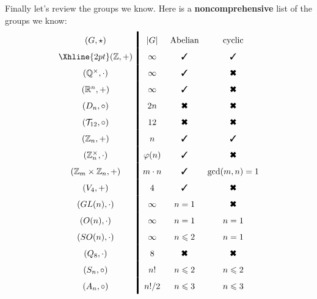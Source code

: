 \documentclass{ximera}
\begin{document}
Finally let's review the groups we know. Here is a
\textbf{noncomprehensive} list of the groups we know:
\[
\renewcommand{\arraystretch}{1.6}
\begin{array}{c!{\vline width 2pt}cccccc}
  (G,\star)                & |G|           & \text{Abelian}        & \text{cyclic}        \\  \Xhline{2pt}
  (\Z,+)                   & \infty        & \text{\ding{51}}      & \text{\ding{51}}     \\
  (\Q^\times,\cdot)        & \infty        & \text{\ding{51}}      & \text{\ding{54}}     \\
  (\R^n,+)                 & \infty        & \text{\ding{51}}      & \text{\ding{54}}     \\
  (D_n,\circ)              & 2n            & \text{\ding{54}}      & \text{\ding{54}}     \\
  (\mathcal{T}_{12},\circ) & 12            & \text{\ding{54}}      & \text{\ding{54}}     \\
  (\Z_n,+)                 & n             & \text{\ding{51}}      & \text{\ding{51}}     \\
  (\Z_n^\times,\cdot)      & \eulerphi(n)  & \text{\ding{51}}      & \text{\ding{54}}     \\    
  (\Z_m\times \Z_n,+)      & m\cdot n      & \text{\ding{51}}      & \gcd(m,n) = 1        \\
  (V_4,+)                  & 4             & \text{\ding{51}}      & \text{\ding{54}}     \\
  (GL(n),\cdot)            & \infty        & n = 1                 & \text{\ding{54}}     \\
  (O(n),\cdot)             & \infty        & n = 1                 & n=1                  \\
  (SO(n),\cdot)            & \infty        & n\le 2                & n=1                  \\
  (Q_8,\cdot)              & 8             & \text{\ding{54}}      & \text{\ding{54}}     \\
  (S_n,\circ)              & n!            & n\le 2                & n\le 2               \\
  (A_n,\circ)              & n!/2          & n\le 3                & n\le 3               \\
\end{array}
\]






\end{document}
